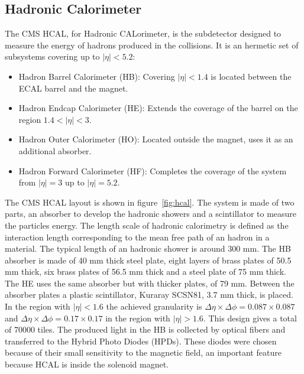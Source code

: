 
\subsection{Hadronic Calorimeter}
\label{sec:hcal}

The CMS HCAL, for Hadronic CALorimeter, is the subdetector designed to measure the energy of hadrons produced in the collisions. It is an hermetic set of subsystems covering up to $|\eta|<5.2$:
\begin{itemize}
\item Hadron Barrel Calorimeter (HB): Covering $|\eta|<1.4$ is located between the ECAL barrel and the magnet. 
\item Hadron Endcap Calorimeter (HE): Extends the coverage of the barrel on the region $1.4<|\eta|<3$.
\item Hadron Outer Calorimeter (HO): Located outside the magnet, uses it as an additional absorber.
\item Hadron Forward Calorimeter (HF): Completes the coverage of the system from $|\eta|=3$ up to $|\eta|=5.2$.
\end{itemize}

The CMS HCAL layout is shown in figure~\ref{fig:hcal}. The system is made of two parts, an absorber to develop the hadronic showers and a scintillator to measure the particles energy. The length scale of hadronic calorimetry is defined as the interaction length corresponding to the mean free path of an hadron in a material. The typical length of an hadronic shower is around 300 mm. The HB absorber is made of 40 mm thick steel plate, eight layers of brass plates of 50.5 mm thick, six brass plates of 56.5 mm thick and a steel plate of 75 mm thick. The HE uses the same absorber but with thicker plates, of 79 mm. Between the absorber plates a plastic scintillator, Kuraray SCSN81, 3.7 mm thick, is placed. In the region with $|\eta|<1.6$ the achieved granularity is $\Delta\eta\times\Delta\phi=0.087\times 0.087$ and $\Delta\eta\times\Delta\phi=0.17\times 0.17$ in the region with $|\eta|>1.6$. This design gives a total of 70000 tiles. The produced light in the HB is collected by optical fibers and transferred to the Hybrid Photo Diodes (HPDs). These diodes were chosen because of their small sensitivity to the magnetic field, an important feature because HCAL is inside the solenoid magnet. %


